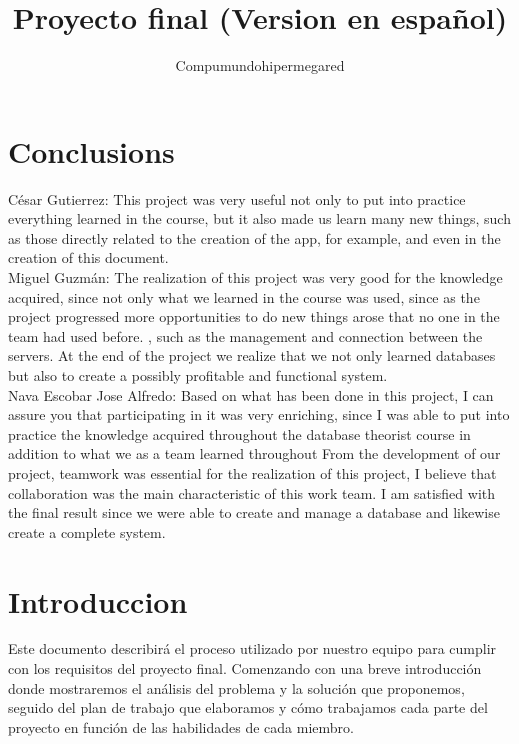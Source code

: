 \documentclass{article}
\begin{document}
\pagebreak

\section{Conclusions}
César Gutierrez: This project was very useful not only to put into practice everything learned in the course, but it also made us learn many new things, such as those directly related to the creation of the app, for example, and even in the creation of this document.\\

Miguel Guzmán: The realization of this project was very good for the knowledge acquired, since not only what we learned in the course was used, since as the project progressed more opportunities to do new things arose that no one in the team had used before. , such as the management and connection between the servers. At the end of the project we realize that we not only learned databases but also to create a possibly profitable and functional system.\\

Nava Escobar Jose Alfredo: Based on what has been done in this project, I can assure you that participating in it was very enriching, since I was able to put into practice the knowledge acquired throughout the database theorist course in addition to what we as a team learned throughout From the development of our project, teamwork was essential for the realization of this project, I believe that collaboration was the main characteristic of this work team. I am satisfied with the final result since we were able to create and manage a database and likewise create a complete system.\\

\title{Proyecto final (Version en español)}
\author{Compumundohipermegared}
\maketitle

\setcounter{section}{0}
\section{Introduccion}
Este documento describirá el proceso utilizado por nuestro equipo para cumplir con los requisitos del proyecto final. Comenzando con una breve introducción donde mostraremos el análisis del problema y la solución que proponemos, seguido del plan de trabajo que elaboramos y cómo trabajamos cada parte del proyecto en función de las habilidades de cada miembro.\\ 
\end{document}
